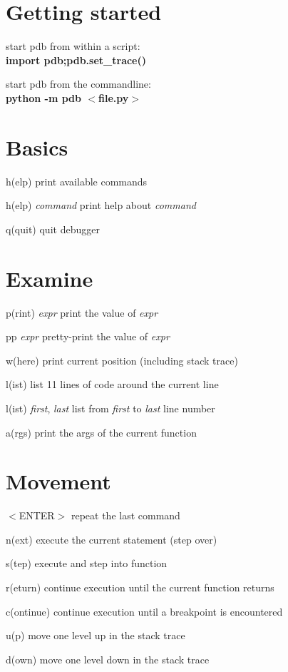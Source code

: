 \documentclass[11pt,landscape,a4paper]{article}
\newcommand{\keystroke}[1]{$<$#1$>$}
\begin{document}
  \begin{multicols}{2}
    \section{Getting started}
      start pdb from within a script:\\
      {\bfseries import pdb;pdb.set\_trace()}

      start pdb from the commandline:\\
      {\bfseries python -m pdb \keystroke{file.py}}

    \section{Basics}
      \begin{eqlist}
        \item[h(elp)] print available commands
        \item[h(elp) \textit{command}] print help about \textit{command}
        \item[q(quit)] quit debugger
      \end{eqlist}

    \section{Examine}
      \begin{eqlist}
        \item[p(rint) \textit{expr}] print the value of \textit{expr}
        \item[pp \textit{expr}] pretty-print the value of \textit{expr}
        \item[w(here)] print current position (including stack trace)
        \item[l(ist)] list 11 lines of code around the current line
        \item[l(ist) \textit{first}, \textit{last}] list from \textit{first} to \textit{last} line number
        \item[a(rgs)] print the args of the current function
      \end{eqlist}

    \section{Movement}
      \begin{eqlist}
        \item[\keystroke{ENTER}] repeat the last command
        \item[n(ext)] execute the current statement (step over)
        \item[s(tep)] execute and step into function
        \item[r(eturn)] continue execution until the current function returns
        \item[c(ontinue)] continue execution until a breakpoint is encountered
        \item[u(p)] move one level up in the stack trace
        \item[d(own)] move one level down in the stack trace
      \end{eqlist}


\end{multicols}
\end{document}
